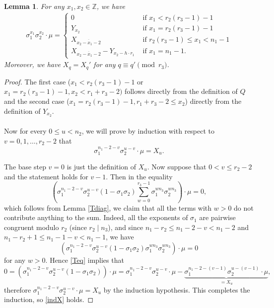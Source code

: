 \documentclass[12pt,a4paper]{article}
\newtheorem{lemma}[theorem]{Lemma}
\theoremstyle{definition}
\newcommand{\Z}{\mathbb{Z}}
\begin{document}
\begin{lemma}\label{XY}
For any $x_1,x_2\in\Z$, we have
\begin{align*}
\sigma_1^{x_1}\sigma_2^{x_2}\cdot \mu=
\begin{cases}
0   &\text{ if }  x_1<r_2(r_3-1)-1\\
Y_{x_2} \quad &\text{ if } x_1=r_2(r_3-1)-1 \\
X_{\overline{x_2-x_1-2}}  \quad &\text{ if } r_2(r_3-1)\leq x_1<n_1-1 \\
X_{\overline{x_2-x_1-2}}-Y_{x_2-h\cdot r_1} &\text{ if }  x_1=n_1-1.
\end{cases}
\end{align*}
Moreover, we have $X_q=X_q'$ for any $q\equiv q'\pmod {r_3}$.
\end{lemma}
\begin{proof}

The first case ($x_1<r_2(r_3-1)-1$ or  $x_1=r_2(r_3-1)-1, x_2< r_1+r_3-2)$ follows directly from the definition of $Q$ and the second case ($x_1=r_2(r_3-1)-1, r_1+r_3-2\leq x_2$) directly from the definition of $Y_{x_2}$.

\paragraph*{}
Now for every $0\leq u <n_2$, we will prove by induction with respect to $v=0,1,\dots,r_2-2$ that 
\begin{equation}\label{indX}
\sigma_1^{n_1-2-v}\sigma_2^{u-v}\cdot \mu =X_u.
\end{equation}

The base step $v=0$ is just the definition of $X_u$. Now suppose that $0<v\leq r_2-2$ and the statement holds for $v-1$. Then in the equality
\begin{equation}\label{Teq}
\left(\sigma_1^{n_1-2-v}\sigma_2^{u-v}(1-\sigma_1\sigma_2)\sum_{w=0}^{r_3-1}\sigma_1^{wn_3}\sigma_2^{wn_3}\right)\cdot \mu=0,
\end{equation}
which follows from Lemma \ref{Tdiag}, we claim that all the terms with $w>0$ do not contribute anything to the sum. Indeed, all the exponents of $\sigma_1$ are pairwise congruent modulo $r_2$ (since $r_2\mid n_3$), and since $n_1-r_2\leq n_1-2-v<n_1-2$ and $n_1-r_2+1\leq n_1-1-v<n_1-1$, we have $$\left(\sigma_1^{n_1-2-v}\sigma_2^{u-v}(1-\sigma_1\sigma_2)\sigma_1^{wn_3}\sigma_2^{wn_3}\right)\cdot \mu=0$$ for any $w>0$. Hence \eqref{Teq} implies that
$$0=\left(\sigma_1^{n_1-2-v}\sigma_2^{u-v}(1-\sigma_1\sigma_2)\right)\cdot \mu=\sigma_1^{n_1-2-v}\sigma_2^{u-v}\cdot \mu-\underbrace{\sigma_1^{n_1-2-(v-1)}\sigma_2^{u-(v-1)}\cdot \mu}_{=X_u},$$
therefore $\sigma_1^{n_1-2-v}\sigma_2^{u-v}\cdot \mu=X_u$ by the induction hypothesis. This completes the induction, so \eqref{indX} holds. %


\end{proof}
\end{document}
